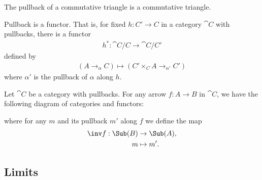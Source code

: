 \documentclass{article}
\begin{document}
\begin{corollary}[Awodey p. 96]
	The pullback of a commutative triangle is a commutative triangle.

	\begin{center}
	\end{center}
\end{corollary}

\begin{proposition}
	Pullback is a functor. That is, for fixed $h:C'\to C$ in a category $\cat C$ with pullbacks,
	there is a functor
	\begin{align*}
		h^*:\cat C/C \to \cat C/C'
	\end{align*}
	defined by
	\begin{align*}
		(A\to_\alpha C)\mapsto (C'\times_C A\to_{\alpha'}C')
	\end{align*}
	where $\alpha'$ is the pullback of $\alpha$ along $h$.
\end{proposition}

\begin{corollary}[Awodey p. 97]
	Let $\cat C$ be a category with pullbacks. For any arrow $f:A\to B$
	in $\cat C$, we have the following diagram of categories and functors:
	\begin{center}
	\end{center}
	where for any $m$ and its pullback $m'$ along $f$ we define
	the map
	\begin{align*}
		\inv f: \Sub(B) & \to\Sub(A), \\
		m               & \mapsto m'.
	\end{align*}
\end{corollary}

\subsection{Limits}
\end{document}
